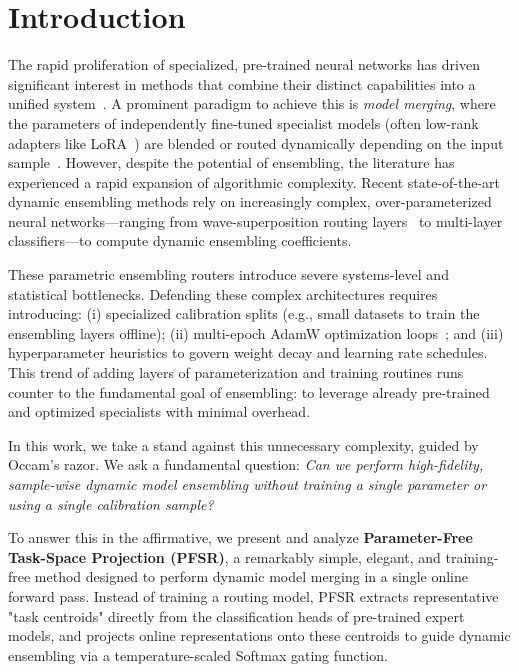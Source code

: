 \section{Introduction}
\label{sec:intro}

The rapid proliferation of specialized, pre-trained neural networks has driven significant interest in methods that combine their distinct capabilities into a unified system~\cite{wortsman2022model, choshen2022fusing}. A prominent paradigm to achieve this is \textit{model merging}, where the parameters of independently fine-tuned specialist models (often low-rank adapters like LoRA~\cite{hu2021lora}) are blended or routed dynamically depending on the input sample~\cite{ilharco2022editing, yadav2023ties}. However, despite the potential of ensembling, the literature has experienced a rapid expansion of algorithmic complexity. Recent state-of-the-art dynamic ensembling methods rely on increasingly complex, over-parameterized neural networks—ranging from wave-superposition routing layers~\cite{gong2024qmerge} to multi-layer classifiers—to compute dynamic ensembling coefficients.

These parametric ensembling routers introduce severe systems-level and statistical bottlenecks. Defending these complex architectures requires introducing: (i) specialized calibration splits (e.g., small datasets to train the ensembling layers offline); (ii) multi-epoch AdamW optimization loops~\cite{kingma2014adam}; and (iii) hyperparameter heuristics to govern weight decay and learning rate schedules. This trend of adding layers of parameterization and training routines runs counter to the fundamental goal of ensembling: to leverage already pre-trained and optimized specialists with minimal overhead.

In this work, we take a stand against this unnecessary complexity, guided by Occam's razor. We ask a fundamental question: \textit{Can we perform high-fidelity, sample-wise dynamic model ensembling without training a single parameter or using a single calibration sample?} 

To answer this in the affirmative, we present and analyze \textbf{Parameter-Free Task-Space Projection (PFSR)}, a remarkably simple, elegant, and training-free method designed to perform dynamic model merging in a single online forward pass. Instead of training a routing model, PFSR extracts representative "task centroids" directly from the classification heads of pre-trained expert models, and projects online representations onto these centroids to guide dynamic ensembling via a temperature-scaled Softmax gating function.

